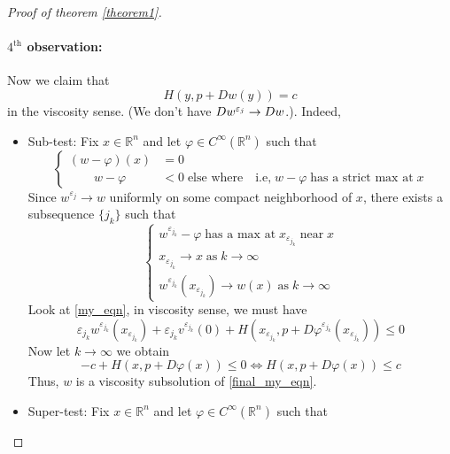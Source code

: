 \documentclass[12pt, oneside]{amsart}  	%
\begin{document}
\begin{proof}[Proof of theorem \ref{theorem1}]
\paragraph{\textbf{$4^{\text{th}}$ observation:}} Now we claim that 
\begin{equation}\label{final_my_eqn}
H(y, p+ Dw(y))=c
\end{equation}
in the viscosity sense.
(We don't have $Dw^{\varepsilon_j}\to Dw$.). Indeed, 
\begin{itemize}
\item Sub-test: Fix $x\in \mathbb{R}^n$ and let $\varphi\in C^\infty(\mathbb{R}^n)$ such that 
\begin{equation*}
\begin{cases}
(w - \varphi)(x) &= 0\\
\qquad w - \varphi &<0 \;\text{else where}\quad \text{i.e,}\; w-\varphi\;\text{has a strict max at}\; x
\end{cases}
\end{equation*}
Since $w^{\varepsilon_j}\longrightarrow w$ uniformly on some compact neighborhood of $x$, there exists a subsequence $\{j_k\}$ such that 
\begin{equation*}
\begin{cases}
w^{\varepsilon_{j_k}} - \varphi \;\text{has a max at}\; x_{\varepsilon_{j_k}}\;\text{near}\;x\\
x_{\varepsilon_{j_k}} \longrightarrow x \;\text{as}\; k\longrightarrow\infty\\
w^{\varepsilon_{j_k}}\left(x_{\varepsilon_{j_k}}\right) \longrightarrow w(x) \;\text{as}\; k\longrightarrow\infty
\end{cases}
\end{equation*}
Look at \eqref{my_eqn}, in viscosity sense, we must have
\begin{equation*}
\varepsilon_{j_k}
w^{\varepsilon_{j_k}}\left(x_{\varepsilon_{j_k}}\right) + 
\varepsilon_{j_k} v^{\varepsilon_{j_k}}(0) +
H(x_{\varepsilon_{j_k}},p+ D\varphi^{\varepsilon_{j_k}}(x_{\varepsilon_{j_k}})) \leq 0
\end{equation*}
Now let $k\longrightarrow \infty$ we obtain 
\begin{equation*}
-c + H(x,p+D\varphi(x)) \leq 0 \Longleftrightarrow H(x,p+D\varphi(x)) \leq c
\end{equation*}
Thus, $w$ is a viscosity subsolution of \eqref{final_my_eqn}.
\item Super-test: Fix $x\in \mathbb{R}^n$ and let $\varphi\in C^\infty(\mathbb{R}^n)$ such that 
\begin{equation*}

\end{equation*}
\end{itemize}
\end{proof}
\end{document}
